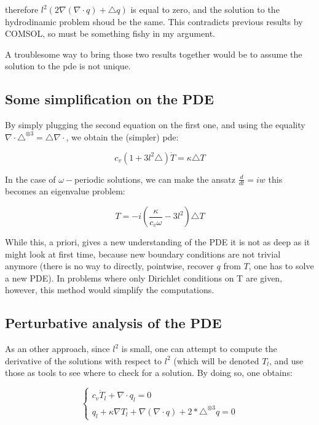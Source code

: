 \documentclass[a4paper, 11pt]{article}
\begin{document}
therefore $l^2(2 \nabla (\nabla \cdot q )+ \triangle q)$ is equal to zero, and the solution to the hydrodinamic problem shoud be the same. This contradicts previous results by COMSOL, so must be something fishy in my argument.

A troublesome way to bring those two results together would be to assume the solution to the pde is not unique.

\subsection{Some simplification on the PDE} %
\label{subname:some_simplification_on_the_pde}

By simply plugging the second equation on the first one, and using the equality $\nabla \cdot \triangle^{\otimes 3} = \triangle \nabla \cdot {}$, we obtain the (simpler) pde:

\begin{equation}
	c_v(1+3l^2 \triangle)\dot T = \kappa \triangle T
\end{equation}

In the case of $\omega-$periodic solutions, we can make the ansatz $\frac{d}{dt} = i w$ this becomes an eigenvalue problem:

\begin{equation}
	T = -i\left(\frac{\kappa}{c_v \omega} - 3 l^2\right) \triangle T
\end{equation}

While this, a priori, gives a new understanding of the PDE it is not as deep as it might look at first time, because new boundary conditions are not trivial anymore (there is no way to directly, pointwise, recover $q$ from $T$, one has to solve a new PDE). In problems where only Dirichlet conditions on T are given, however, this method would simplify the computations.  

\subsection{Perturbative analysis of the PDE} %
\label{sub:perturbative_analysis_of_the_pde}

As an other approach, since $l^2$ is small, one can attempt to compute the derivative of the solutions with respect to $l^2$ (which will be denoted $T_l$, and use those as tools to see where to check for a solution. By doing so, one obtains:


\begin{equation}
	\label{eq:hydrodinamic_pde_derivative}
	\begin{cases}
		{c_v \dot T_l + \nabla \cdot q_l =0} \\
		{q_l +\kappa \nabla T_l + \nabla(\nabla \cdot q) + 2*\triangle^{\otimes 3} q = 0}
	\end{cases}
\end{equation}
\end{document}
